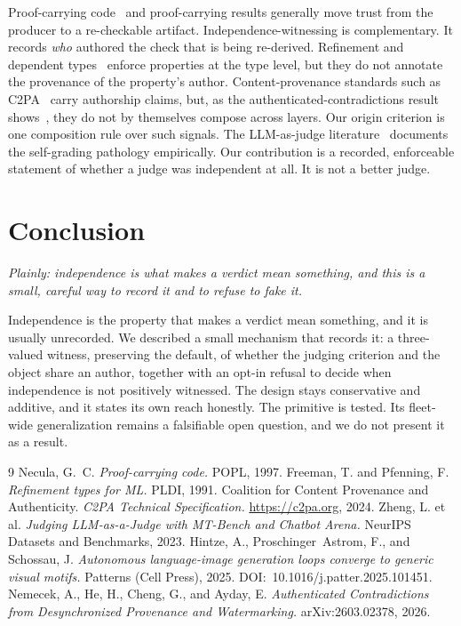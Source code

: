 \documentclass[11pt]{article}
\begin{document}
Proof-carrying code~\cite{pcc} and proof-carrying results generally move trust from the producer to a re-checkable artifact. Independence-witnessing is complementary. It records \emph{who} authored the check that is being re-derived. Refinement and dependent types~\cite{refinement} enforce properties at the type level, but they do not annotate the provenance of the property's author. Content-provenance standards such as C2PA~\cite{c2pa} carry authorship claims, but, as the authenticated-contradictions result shows~\cite{authcontra}, they do not by themselves compose across layers. Our origin criterion is one composition rule over such signals. The LLM-as-judge literature~\cite{llmjudge} documents the self-grading pathology empirically. Our contribution is a recorded, enforceable statement of whether a judge was independent at all. It is not a better judge.

\section{Conclusion}
\emph{Plainly: independence is what makes a verdict mean something, and this is a small, careful way to record it and to refuse to fake it.}

Independence is the property that makes a verdict mean something, and it is usually unrecorded. We described a small mechanism that records it: a three-valued witness, preserving the default, of whether the judging criterion and the object share an author, together with an opt-in refusal to decide when independence is not positively witnessed. The design stays conservative and additive, and it states its own reach honestly. The primitive is tested. Its fleet-wide generalization remains a falsifiable open question, and we do not present it as a result.

\begin{thebibliography}{9}
\small
{} Necula, G.~C. \emph{Proof-carrying code.} POPL, 1997.
 Freeman, T. and Pfenning, F. \emph{Refinement types for ML.} PLDI, 1991.
 Coalition for Content Provenance and Authenticity. \emph{C2PA Technical Specification.} \url{https://c2pa.org}, 2024.
 Zheng, L. et al. \emph{Judging LLM-as-a-Judge with MT-Bench and Chatbot Arena.} NeurIPS Datasets and Benchmarks, 2023.
 Hintze, A., Proschinger~Astrom, F., and Schossau, J. \emph{Autonomous language-image generation loops converge to generic visual motifs.} Patterns (Cell Press), 2025. DOI:~10.1016/j.patter.2025.101451.
 Nemecek, A., He, H., Cheng, G., and Ayday, E. \emph{Authenticated Contradictions from Desynchronized Provenance and Watermarking.} arXiv:2603.02378, 2026.
\end{thebibliography}
\end{document}
